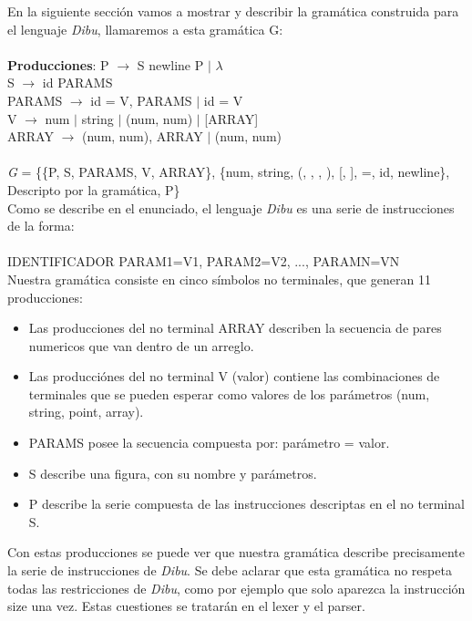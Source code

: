 En la siguiente sección vamos a mostrar y describir la gramática construida para el lenguaje \textit{Dibu}, llamaremos a esta
gramática G:\\
\\
\textbf{Producciones}:
\newline
P $\rightarrow$ S newline P $\mid$ $\lambda$\\
S $\rightarrow$ id PARAMS\\
PARAMS $\rightarrow$  id = V, PARAMS $\mid$ id = V\\
V $\rightarrow$ num $\mid$ string $\mid$ (num, num) $\mid$ [ARRAY]\\
ARRAY $\rightarrow$ (num, num), ARRAY $\mid$ (num, num)\\
\\
\textit{G} = \{\{P, S, PARAMS, V, ARRAY\}, \{num, string, (, , , ), [, ], =, id, newline\}, Descripto por la gramática, P\}\\

Como se describe en el enunciado, el lenguaje \textit{Dibu} es una serie de instrucciones de la forma:\\
\\
IDENTIFICADOR PARAM1=V1, PARAM2=V2, ..., PARAMN=VN\\

Nuestra gramática consiste en cinco s\'imbolos no terminales, que generan 11 producciones:
\begin{itemize}
	\item Las producciones del no terminal ARRAY describen la secuencia de pares numericos que van dentro de un arreglo.
	\item Las producciónes del no terminal V (valor) contiene las combinaciones de terminales que se pueden esperar como valores de los parámetros (num, string, point, array).
	\item PARAMS posee la secuencia compuesta por: parámetro = valor.
	\item S describe una figura, con su nombre y parámetros.
	\item P describe la serie compuesta de las instrucciones descriptas en el no terminal S.
\end{itemize}

Con estas producciones se puede ver que nuestra gramática describe precisamente la serie de instrucciones de \textit{Dibu}. Se debe
aclarar que esta gramática no respeta todas las restricciones de \textit{Dibu}, como por ejemplo que solo aparezca la
instrucción size una vez. Estas cuestiones se tratarán en el lexer y el parser.\\

